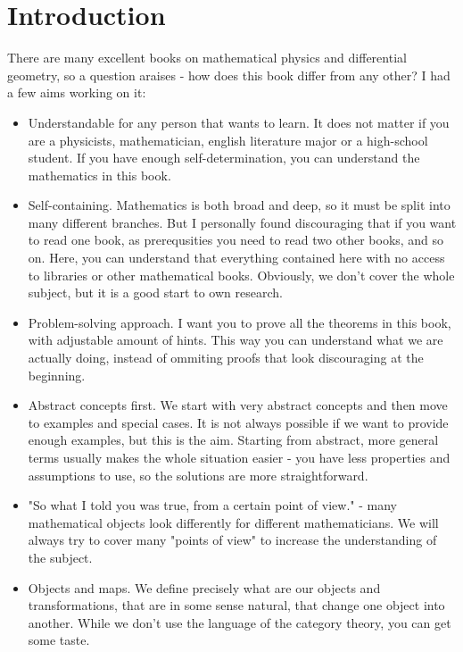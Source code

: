 \chapter{Introduction}
\label{intro} %

There are many excellent books on mathematical physics and differential geometry, so a question araises - how does
this book differ from any other? I had a few aims working on it:
\begin{itemize}
  \item Understandable for any person that wants to learn. It does not matter
    if you are a physicists, mathematician, english literature major or a high-school student. If you have
    enough self-determination, you can understand the mathematics in this book.
  \item Self-containing. Mathematics is both broad and deep, so it must be split into many
    different  branches. But I personally found discouraging that if you want to read one book, as prerequsities you need
    to read two other books, and so on. Here, you can understand that everything contained here with no access to libraries or
    other mathematical books. Obviously, we don't cover the whole subject, but it is a good start to own research.
  \item Problem-solving approach. I want you to prove all the theorems in this book, with adjustable amount of hints.
      This way you can understand what we are actually doing, instead of ommiting proofs that look discouraging at the beginning.
  \item Abstract concepts first. We start with very abstract concepts and then move to examples and special cases. It is not always possible if we want to provide
    enough examples, but this is the aim. Starting from abstract, more general terms usually makes the whole situation easier - you have less properties and assumptions to use,
    so the solutions are more straightforward.
  \item "So what I told you was true, from a certain point of view." - many mathematical objects look differently for different mathematicians. We will always try to cover many
    "points of view" to increase the understanding of the subject.
  \item Objects and maps. We define precisely what are our objects and transformations, that are in some sense natural, that change one object into another. While we don't use the
    language of the category theory, you can get some taste.

\end{itemize}
